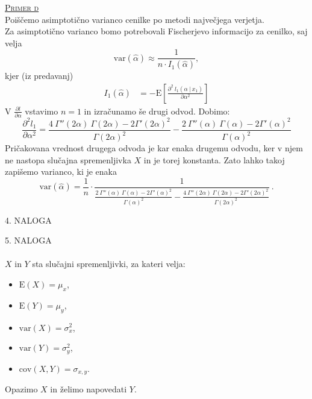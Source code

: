 \documentclass[a4paper,12pt]{article}
\begin{document}
\noindent
\textsc{\underline{Primer d}}
\\
Poiščemo asimptotično varianco cenilke po metodi največjega verjetja.
\\
Za asimptotično varianco bomo potrebovali Fischerjevo informacijo za cenilko, saj velja 
$$\text{var}(\hat{\alpha}) \approx \frac{1}{n \cdot I_1(\hat{\alpha})}, $$
kjer (iz predavanj) 
\begin{align}\label{en:fish}
    I_1(\hat{\alpha}) &= - \text{E} \left[ \frac{ \partial^2 \ l_1(\alpha \ | \ x_1)}{\partial \alpha^2} \right]
\end{align}
V $\frac{\partial l}{\partial \alpha}$ vstavimo $n = 1$ in izračunamo še drugi odvod. Dobimo:
$$ \frac{\partial^2 l_1}{\partial \alpha^2} = \frac{4 \ \Gamma '' (2 \alpha) \ \Gamma(2 \alpha) - 2 \Gamma' (2 \alpha)^2}{\Gamma (2 \alpha) ^2} - \frac{2 \ \Gamma '' (\alpha) \ \Gamma (\alpha) - 2 \Gamma ' (\alpha) ^ 2}{\Gamma (\alpha)^2}$$
Pričakovana vrednost drugega odvoda je kar enaka drugemu odvodu, ker v njem ne nastopa slučajna spremenljivka $X$ in je torej konstanta. Zato lahko takoj zapišemo varianco, ki je enaka
$$\text{var}(\hat{\alpha}) = \frac{1}{n} \cdot \frac{1}{ \frac{2 \ \Gamma '' (\alpha) \ \Gamma (\alpha) - 2 \Gamma ' (\alpha) ^ 2}{\Gamma (\alpha)^2} - \frac{4 \ \Gamma '' (2 \alpha) \ \Gamma(2 \alpha) - 2 \Gamma' (2 \alpha)^2}{\Gamma (2 \alpha) ^2} } \ .$$




\noindent
\textsc{\large{4. NALOGA}}


\noindent
\textsc{\large{5. NALOGA}}
\\
\\
$X$ in $Y$ sta slučajni spremenljivki, za kateri velja:
\begin{itemize} 
    \item $\text{E}(X) = \mu_x$,
    \item $\text{E}(Y) = \mu_y$,
    \item $\text{var}(X) = \sigma_x^2$,
    \item $\text{var}(Y) = \sigma_y^2$,
    \item $\text{cov}(X,Y) = \sigma_{x,y}$.
\end{itemize}
Opazimo $X$ in želimo napovedati $Y$. 
\\
\end{document}
